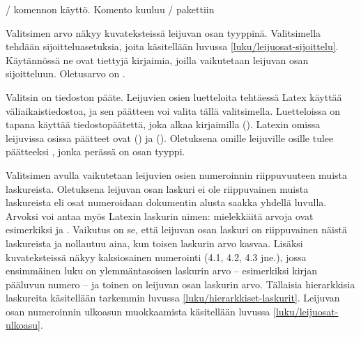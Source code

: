 
\begin{esimerkki*}

\begin{koodilohko}
\end{koodilohko}

\caption{\-/ komennon käyttö. Komento
  kuuluu \-/ pakettiin}
\label{esim/declarenewfloat}
\end{esimerkki*}

Valitsimen  arvo näkyy kuvateksteissä leijuvan osan
tyyppinä. Valitsimella  tehdään sijoitteluasetuksia,
joita käsitellään luvussa \ref{luku/leijuosat-sijoittelu}. Käytännössä
ne ovat tiettyjä kirjaimia, joilla vaikutetaan leijuvan osan
sijoitteluun. Oletusarvo on .

Valitsin  on tiedoston pääte. Leijuvien osien
luetteloita tehtäessä Latex käyttää väliaikaistiedostoa, ja sen päätteen
voi valita tällä valitsimella. Luetteloissa on tapana käyttää
tiedostopäätettä, joka alkaa kirjaimilla  (). Latexin omissa leijuvissa osissa päätteet ovat 
() ja  ().
Oletuksena omille leijuville osille tulee päätteeksi , jonka
perässä on osan tyyppi.

Valitsimen  avulla vaikutetaan leijuvien osien numeroinnin
riippuvuuteen muista laskureista. Oletuksena leijuvan osan laskuri ei
ole riippuvainen muista laskureista eli osat numeroidaan dokumentin
alusta saakka yhdellä luvulla. Arvoksi voi antaa myös Latexin laskurin
nimen: mielekkäitä arvoja ovat esimerkiksi  ja
. Vaikutus on se, että leijuvan osan laskuri on
riippuvainen näistä laskureista ja nollautuu aina, kun toisen laskurin
arvo kasvaa. Lisäksi kuvateksteissä näkyy kaksiosainen numerointi (4.1,
4.2, 4.3 jne.), jossa ensimmäinen luku on ylemmäntasoisen laskurin arvo
-- esimerkiksi kirjan pääluvun numero -- ja toinen on leijuvan osan
laskurin arvo. Tällaisia hierarkkisia laskureita käsitellään tarkemmin
luvussa \ref{luku/hierarkkiset-laskurit}. Leijuvan osan numeroinnin
ulkoasun muokkaamista käsitellään luvussa \ref{luku/leijuosat-ulkoasu}.

